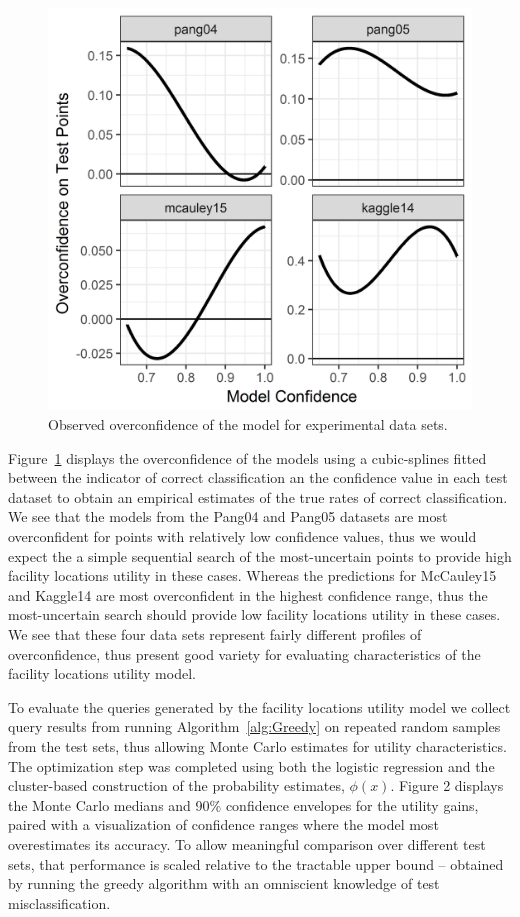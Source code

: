 \documentclass[letterpaper]{article} %
\begin{document}
\begin{figure}[hbtp]
  \includegraphics[width=.45\textwidth]{../experimentsAndPlots/overconfidence.png}
  \caption{Observed overconfidence of the model for experimental data sets.}
  \label{fig:overconf}
\end{figure}

Figure~\ref{fig:overconf} displays the overconfidence of the models using a cubic-splines fitted between the indicator of correct classification an the confidence value in each test dataset to obtain an empirical estimates of the true rates of correct classification. We see that the models from the Pang04 and Pang05 datasets are most overconfident for points with relatively low confidence values, thus we would expect the a simple sequential search of the most-uncertain points to provide high facility locations utility in these cases. Whereas the predictions for McCauley15 and Kaggle14 are most overconfident in the highest confidence range, thus the most-uncertain search should provide low facility locations utility in these cases. We see that these four data sets represent fairly different profiles of overconfidence, thus present good variety for evaluating characteristics of the facility locations utility model. 


To evaluate the queries generated by the facility locations utility model we collect query results from running Algorithm~\ref{alg:Greedy} on repeated random samples from the test sets, thus allowing Monte Carlo estimates for utility characteristics. The optimization step was completed using both the logistic regression and the cluster-based construction of the probability estimates, $\phi(x)$. Figure 2 displays the Monte Carlo medians and 90\% confidence envelopes for the utility gains, paired with a visualization of confidence ranges where the model most overestimates its accuracy. To allow meaningful comparison over different test sets, that performance is scaled relative to the tractable upper bound – obtained by running the greedy algorithm with an omniscient knowledge of test misclassification. 
\end{document}
